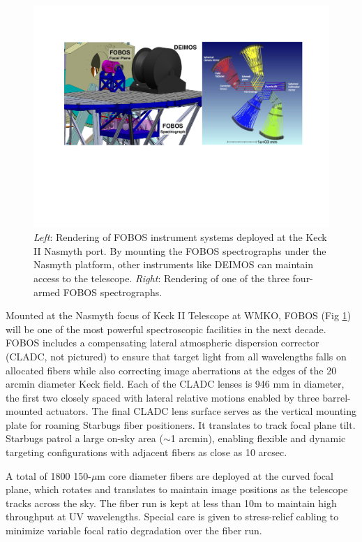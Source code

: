 \documentclass[oneside,11pt]{amsart}
\begin{document}
\begin{figure}[h!]
%
\vskip -0.1in
%
\includegraphics[width=\textwidth]{figs/FOBOS_inst.pdf}
%
\caption{\small {\it Left}: Rendering of FOBOS instrument systems
deployed at the Keck II Nasmyth port.  By mounting the FOBOS
spectrographs under the Nasmyth platform, other instruments like DEIMOS
can maintain access to the telescope. {\it Right}: Rendering of one of
the three four-armed FOBOS spectrographs.}
%
\label{fig:layout}
%
\end{figure}

Mounted at the Nasmyth focus of Keck II Telescope at WMKO, FOBOS (Fig
\ref{fig:layout}) will be one of the most powerful spectroscopic
facilities in the next decade.  FOBOS includes a compensating lateral
atmospheric dispersion corrector (CLADC, not pictured) to ensure that
target light from all wavelengths falls on allocated fibers while also
correcting image aberrations at the edges of the 20 arcmin diameter Keck
field.  Each of the CLADC lenses is 946 mm in diameter, the first two
closely spaced with lateral relative motions enabled by three
barrel-mounted actuators.  The final CLADC lens surface serves as the
vertical mounting plate for roaming Starbugs fiber positioners.  It
translates to track focal plane tilt.  Starbugs patrol a large on-sky
area ($\sim$1 arcmin), enabling flexible and dynamic targeting
configurations with adjacent fibers as close as 10 arcsec.

A total of 1800 150-$\mu$m core diameter fibers are deployed at the
curved focal plane, which rotates and translates to maintain image
positions as the telescope tracks across the sky.  The fiber run is kept
at less than 10m to maintain high throughput at UV wavelengths.  Special
care is given to stress-relief cabling to minimize variable focal ratio
degradation over the fiber run.
\end{document}
